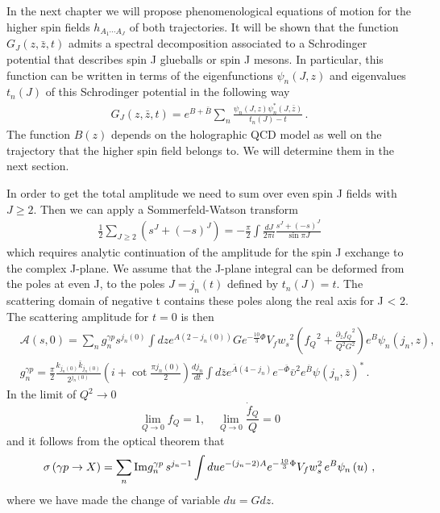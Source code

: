 \documentclass[a4paper,12pt]{article}
\begin{document}
In the next chapter we will propose phenomenological equations of motion for the higher spin fields $h_{A_1 \cdots A_J}$ of both trajectories. It will be shown that the function $G_J \left(z, \bar{z}, t\right)$ admits a spectral decomposition associated to a Schrodinger potential that describes spin J glueballs or spin J mesons. In particular, this function can be written in terms of the eigenfunctions $\psi_n\left(J, z\right)$ and eigenvalues $t_n\left(J\right)$ of this Schrodinger potential in the following way
\begin{align} 
G_J \left(z , \bar{z}, t \right) = e^{B + \bar{B}}  \sum_n \frac{\psi_n \left(J, z\right) \psi_n^* \left(J, \bar{z}\right)}{t_n\left(J\right) - t} \, .
\end{align}
The function $B(z)$ depends on the holographic QCD model as well on the trajectory that the higher spin field belongs to. We will determine them in the next section.

In order to get the total amplitude we need to sum over even spin J fields with $J \geq 2$. Then we can apply a Sommerfeld-Watson transform
\begin{align}
\frac{1}{2} \sum_{J \geq 2} \left(s^J + {\left(-s\right)}^J\right) = - \frac{\pi}{2} \int \frac{d J}{2 \pi i} \frac{s^J + \left(-s\right)^J}{\sin \pi J}
\end{align}
which requires analytic continuation of the amplitude for the spin J exchange to the complex J-plane. We assume that the J-plane integral can be deformed from the poles at even J, to the poles $J = j_n \left(t\right)$ defined by $t_n \left(J\right) = t$. The scattering domain of negative t contains these poles along the real axis for J < 2. The scattering amplitude for $t = 0$ is then
\begin{align}
&\mathcal{A} \left(s, 0 \right) = \sum_n g^{\gamma p}_n s^{j_n\left(0\right)} \int dz e^{A(2 - {j_n\left(0\right)})} G e^{-\frac{10}{3} \Phi}  V_f {w_s}^2  \left(  {f_Q}^2 + \frac{{\partial_z f_Q}^2}{Q^2 G^2}  \right) e^{B} \psi_n \left(j_n, z\right), \label{eq:gp_forward_scattering_amp} \\
& g_n^{\gamma p} = \frac{\pi}{2} \frac{k_{j_n\left(0\right)} \bar{k}_{j_n\left(0\right)}}{2^{j_n\left(0\right)}}  \left(i + \cot \frac{\pi j_n\left(0\right)}{2} \right) \frac{d j_n}{dt} \int d\bar{z} e^{\bar{A}\left( 4 - j_n \right)} e^{-\bar{\Phi}}  {\bar{\upsilon}}^2 e^{\bar{B}}  {\psi\left(j_n, \bar{z}\right)}^{*} \, . \label{eq:gp_couplings_def}
\end{align}
In the limit of $Q^2 \rightarrow 0$
\begin{equation}
\lim_{Q\rightarrow 0} f_Q = 1 , \quad \lim_{Q\rightarrow 0} \frac{\dot{f}_Q}{Q} = 0
\end{equation}
and it follows from the optical theorem that
\begin{equation}
\sigma\left(\gamma p \rightarrow X\right) = \sum_n {\rm Im} g^{\gamma p}_n \,  s^{j_n - 1} \int du e^{-\left(j_n - 2 \right)A } e^{-\frac{10}{3} \Phi} V_f w_s^2  \, e^B \psi_n\left(u\right) \, ,
\label{eq:sigma_gp_hol_gens}
\end{equation}
where we have made the change of variable $d u = G d z$.
\end{document}
